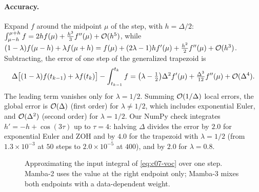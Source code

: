 \paragraph{Accuracy.} Expand $f$ around the midpoint $\mu$ of the step, with $h = \Delta/2$:
$\int_{\mu-h}^{\mu+h} f = 2hf(\mu) + \tfrac{h^3}{3}f''(\mu) + \mathcal{O}(h^5)$, while
$(1-\lambda)f(\mu-h) + \lambda f(\mu+h) = f(\mu) + (2\lambda-1)hf'(\mu) + \tfrac{h^2}{2}f''(\mu) + \mathcal{O}(h^3)$.
Subtracting, the error of one step of the generalized trapezoid is
\begin{equation}\label{eq:c07-trap-error}
  \Delta\bigl[(1-\lambda)f(t_{k-1}) + \lambda f(t_k)\bigr] - \int_{t_{k-1}}^{t_k} f
  = \bigl(\lambda - \tfrac12\bigr)\Delta^2 f'(\mu) + \tfrac{\Delta^3}{12}f''(\mu) + \mathcal{O}(\Delta^4).
\end{equation}
The leading term vanishes only for $\lambda = 1/2$. Summing $\mathcal{O}(1/\Delta)$ local errors, the
global error is $\mathcal{O}(\Delta)$ (first order) for $\lambda\ne 1/2$, which includes exponential
Euler, and $\mathcal{O}(\Delta^2)$ (second order) for $\lambda = 1/2$. Our NumPy check integrates
$h' = -h + \cos(3\tau)$ up to $\tau = 4$: halving $\Delta$ divides the error by $2.0$ for
exponential Euler and ZOH and by $4.0$ for the trapezoid with $\lambda = 1/2$ (from
$1.3\times10^{-3}$ at $50$ steps to $2.0\times10^{-5}$ at $400$), and by $2.0$ for $\lambda=0.8$.

\begin{figure}[t]
\centering
{}
\caption{Approximating the input integral of \cref{eq:c07-voc} over one step. Mamba-2 uses the
value at the right endpoint only; Mamba-3 mixes both endpoints with a data-dependent weight.}
\label{fig:c07-quadrature}
\end{figure}

